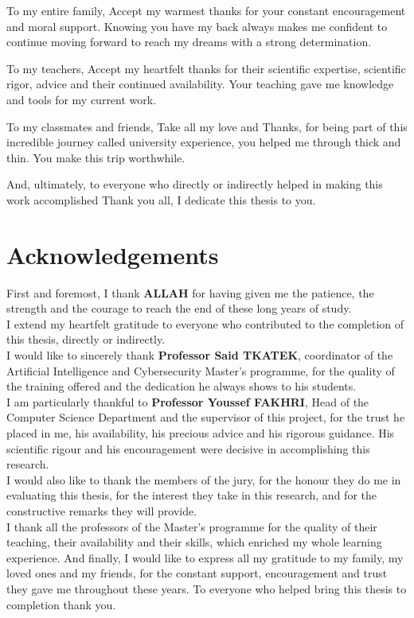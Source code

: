 \documentclass[12pt, a4paper, oneside]{report}
\begin{document}
To my entire family, Accept my warmest thanks for your constant encouragement and moral support. Knowing you have my back always makes me confident to continue moving forward to reach my dreams with a strong determination.

To my teachers, Accept my heartfelt thanks for their scientific expertise, scientific rigor, advice and their continued availability. Your teaching gave me knowledge and tools for my current work.

To my classmates and friends, Take all my love and Thanks, for being part of this incredible journey called university experience, you helped me through thick and thin. You make this trip worthwhile.

And, ultimately, to everyone who directly or indirectly helped in making this work accomplished Thank you all, I dedicate this thesis to you.

\newpage

\chapter*{Acknowledgements}
First and foremost, I thank \textbf{ALLAH} for having given me the patience, the strength and the courage to reach the end of these long years of study.\\
I extend my heartfelt gratitude to everyone who contributed to the completion of this thesis, directly or indirectly.\\
I would like to sincerely thank \textbf{Professor Said TKATEK}, coordinator of the Artificial Intelligence and Cybersecurity Master's programme, for the quality of the training offered and the dedication he always shows to his students.\\
I am particularly thankful to \textbf{Professor Youssef FAKHRI}, Head of the Computer Science Department and the supervisor of this project, for the trust he placed in me, his availability, his precious advice and his rigorous guidance. His scientific rigour and his encouragement were decisive in accomplishing this research.\\
I would also like to thank the members of the jury, for the honour they do me in evaluating this thesis, for the interest they take in this research, and for the constructive remarks they will provide.\\
I thank all the professors of the Master's programme for the quality of their teaching, their availability and their skills, which enriched my whole learning experience.
And finally, I would like to express all my gratitude to my family, my loved ones and my friends, for the constant support, encouragement and trust they gave me throughout these years. To everyone who helped bring this thesis to completion thank you.
\end{document}

